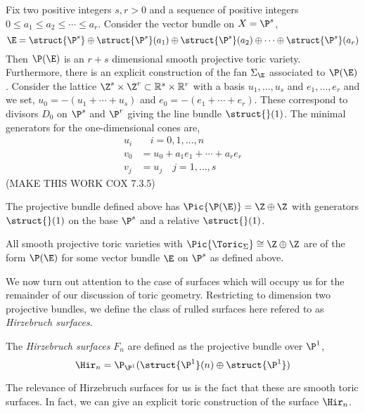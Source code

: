 \begin{prop}[Cox 7.3.5]
Fix two positive integers $s, r > 0$ and a sequence of positive integers $0 \le a_1 \le a_2 \le \cdots \le a_r$. Consider the vector bundle on $X = \P^s$,
\begin{equation}
\E = \struct{\P^s} \oplus \struct{\P^s}(a_1) \oplus \struct{\P^s}(a_2) \oplus \cdots \oplus \struct{\P^s}(a_r) 
\end{equation}
Then $\P(\E)$ is an $r + s$ dimensional smooth projective toric variety. Furthermore, there is an explicit construction of the fan $\Sigma_\E$ associated to $\P(\E)$. Consider the lattice $\Z^s \times \Z^r \subset \mathbb{R}^s \times \mathbb{R}^r$ with a basis $u_1, \dots, u_s$ and $e_1, \dots, e_r$ and we set, $u_0 = -(u_1 + \cdots + u_s)$ and $e_0 = -(e_1 + \cdots + e_r)$. These correspond to divisors $D_0$ on $\P^s$ and $\P^r$ giving the line bundle $\struct{}(1)$. The minimal generators for the one-dimensional cones are,
\begin{align}
u_i & \quad i = 0, 1, \dots, n
\\
v_0 & = u_0 + a_1 e_1 + \cdots + a_r e_r
\\
v_j & = u_j \quad j = 1, \dots, s
\end{align} 
(MAKE THIS WORK COX 7.3.5)
\end{prop}

\begin{prop}
The projective bundle defined above has $\Pic{\P(\E)} = \Z \oplus \Z$ with generators $\struct{}(1)$ on the base $\P^s$ and a relative $\struct{}(1)$. 
\end{prop}

\begin{theorem}[Kleinschmidt]
All smooth projective toric varieties with $\Pic{\Toric_\Sigma} \cong \Z \oplus \Z$ are of the form $\P(\E)$ for some vector bundle $\E$ on $\P^s$ as defined above. 
\end{theorem}

We now turn out attention to the case of surfaces which will occupy us for the remainder of our discussion of toric geometry. Restricting to dimension two projective bundles, we define the class of rulled surfaces here refered to as \textit{Hirzebruch surfaces}.

\begin{defn}
The \textit{Hirzebruch surfaces} $F_n$ are defined as the projective bundle over $\P^1$,
\[ \Hir_n = \P_{\P^1}(\struct{\P^1}(n) \oplus \struct{\P^1}) \]
\end{defn}

The relevance of Hirzebruch surfaces for us is the fact that these are smooth toric surfaces. In fact, we can give an explicit toric construction of the surface $\Hir_n$.
